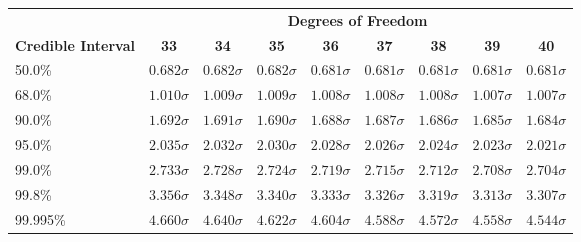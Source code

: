 \begin{center}
\begin{tabular}{p{0.75in}cccccccc}
 & \multicolumn{8}{c}{\bf Degrees of Freedom} \\
{\bf Credible Interval} & {\bf 33} & {\bf 34} & {\bf 35} & {\bf 36} & {\bf 37} & {\bf 38} & {\bf 39} & {\bf 40}\\
50.0\%& $ 0.682 \sigma$& $ 0.682 \sigma$& $ 0.682 \sigma$& $ 0.681 \sigma$& $ 0.681 \sigma$& $ 0.681 \sigma$& $ 0.681 \sigma$& $ 0.681 \sigma$\\
68.0\%& $ 1.010 \sigma$& $ 1.009 \sigma$& $ 1.009 \sigma$& $ 1.008 \sigma$& $ 1.008 \sigma$& $ 1.008 \sigma$& $ 1.007 \sigma$& $ 1.007 \sigma$\\
90.0\%& $ 1.692 \sigma$& $ 1.691 \sigma$& $ 1.690 \sigma$& $ 1.688 \sigma$& $ 1.687 \sigma$& $ 1.686 \sigma$& $ 1.685 \sigma$& $ 1.684 \sigma$\\
95.0\%& $ 2.035 \sigma$& $ 2.032 \sigma$& $ 2.030 \sigma$& $ 2.028 \sigma$& $ 2.026 \sigma$& $ 2.024 \sigma$& $ 2.023 \sigma$& $ 2.021 \sigma$\\
99.0\%& $ 2.733 \sigma$& $ 2.728 \sigma$& $ 2.724 \sigma$& $ 2.719 \sigma$& $ 2.715 \sigma$& $ 2.712 \sigma$& $ 2.708 \sigma$& $ 2.704 \sigma$\\
99.8\%& $ 3.356 \sigma$& $ 3.348 \sigma$& $ 3.340 \sigma$& $ 3.333 \sigma$& $ 3.326 \sigma$& $ 3.319 \sigma$& $ 3.313 \sigma$& $ 3.307 \sigma$\\
99.995\%& $ 4.660 \sigma$& $ 4.640 \sigma$& $ 4.622 \sigma$& $ 4.604 \sigma$& $ 4.588 \sigma$& $ 4.572 \sigma$& $ 4.558 \sigma$& $ 4.544 \sigma$\\
\end{tabular}
\end{center}